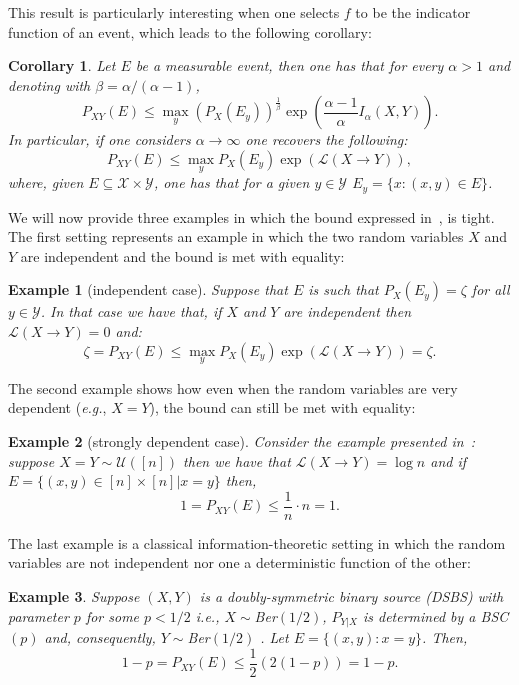 \documentclass{article}
\numberwithin{theorem}{section}
\newtheorem{corollary}[theorem]{Corollary}
\newtheorem{example}{Example}
\numberwithin{example}{section}
\numberwithin{remark}{section}
\numberwithin{definition}{section}
\newcommand{\X}{\mathcal{X}}
\newcommand{\Y}{\mathcal{Y}}
\newcommand{\ml}[2]{\mathcal{L}\left(#1  \!\!  \to  \!\!   #2\right)} %
\begin{document}
This result is particularly interesting when one selects $f$ to be the indicator function of an event, which leads to the following corollary:
\begin{corollary}\label{thm:probBoundIalpha}
Let $E$ be a measurable event, then one has that for every $\alpha>1$ and denoting with $\beta=\alpha/(\alpha-1)$,
\begin{equation}
    P_{XY}(E) \leq \max_y \left(P_X(E_y)\right)^\frac1\beta\exp\left(\frac{\alpha-1}{\alpha}I_\alpha(X,Y)\right).
    \end{equation}
    In particular, if one considers $\alpha\to\infty$ one recovers the following:
       \begin{equation}
        P_{XY}(E) \leq \max_y P_X(E_y)\exp\left(\ml{X}{Y}\right),\label{eq:probBoundML}
    \end{equation}
    where, given $E\subseteq \X\times\Y $, one has that for a given $y\in\Y$ $E_y=\{x:(x,y)\in E\}$.
\end{corollary}
We will now provide three examples in which the bound expressed in~, is tight. The first setting represents an example in which the two random variables $X$ and $Y$ are independent and the bound is met with equality:
\begin{example}[independent case]
\label{tightness1}
   Suppose that $E$ is such that $P_X(E_y)=\zeta$ for all $y\in\Y$. In that case we have that, if $X$ and $Y$ are independent then $\ml{X}{Y}=0$ and:
    \begin{equation}
        \zeta=P_{XY}(E) \leq \max_y P_X(E_y)\exp(\ml{X}{Y}) =  \zeta.
    \end{equation}
\end{example}
The second example shows how even when the random variables are very dependent (\textit{e.g.}, $X=Y$), the bound can still be met with equality:
\begin{example}[strongly dependent case]
\label{tightness2}
   Consider the example presented in~\cite{BassilySNSY:18}: suppose $X=Y\sim\mathcal{U}([n])$ then we have that $\ml{X}{Y}=\log n$ and if $E=\{(x,y)\in [n]\times[n] | x=y\}$ then, 
    \begin{equation}
        1= P_{XY}(E) \leq \frac1n \cdot n = 1.
    \end{equation}
\end{example}
The last example is a classical information-theoretic setting in which the random variables are not independent nor one a deterministic function of the other: 
\begin{example}
Suppose $(X,Y)$ is a doubly-symmetric binary source (DSBS) with parameter $p$ for some $p<1/2$ \textit{i.e.}, $X\sim$Ber$(1/2)$, $P_{Y|X}$ is determined by a BSC$(p)$ and, consequently, $Y\sim$Ber$(1/2)$ . Let  $E = \{(x,y): x=y\}$. Then,
\begin{equation}
1 - p = P_{XY}(E) \leq \frac{1}{2}(2(1-p)) = 1 -p.
\end{equation}
\end{example}
\end{document}
